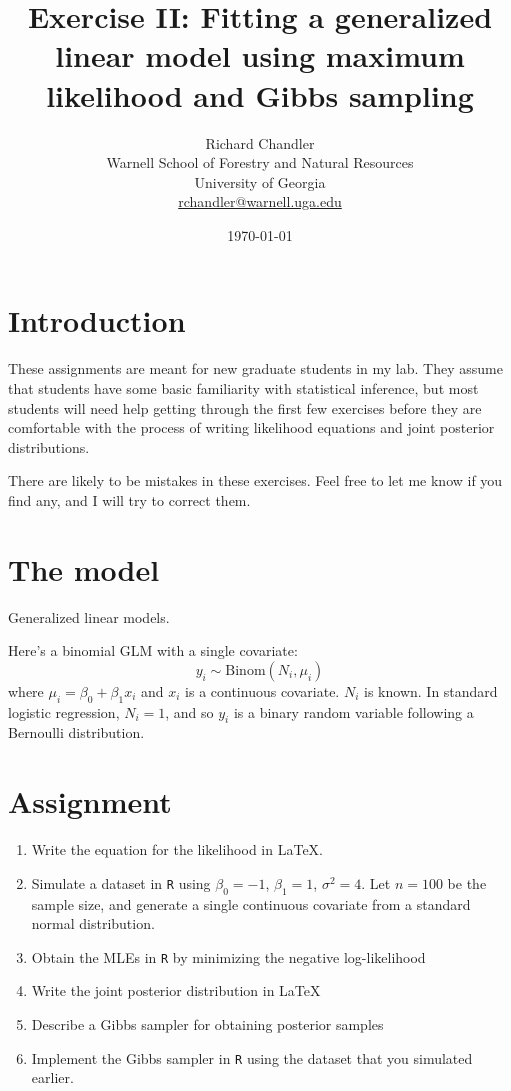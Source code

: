 \documentclass[11pt]{article}
\begin{document}
\title{Exercise II: Fitting a generalized linear model using maximum likelihood and
  Gibbs sampling} 
\author{Richard Chandler \\ Warnell School of Forestry and Natural
  Resources \\ University of Georgia \\ \href{mailto:rchandler@warnell.uga.edu}{rchandler@warnell.uga.edu}
}
\date{\today}

\maketitle


\section*{Introduction}

These assignments are meant for new graduate students in my lab. They
assume that students have some basic familiarity with statistical
inference, but most students will need help getting through the first
few exercises before they are comfortable with the process of writing
likelihood equations and joint posterior distributions. 

There are likely to be mistakes in these exercises. Feel free to let
me know if you find any, and I will try to correct them.


\section*{The model}

Generalized linear models.

Here's a binomial GLM with a single covariate:
\[
  y_i \sim \mathrm{Binom}(N_i, \mu_i)
\]
where $\mu_i = \beta_0 + \beta_1 x_i$ and $x_i$ is a continuous
covariate. $N_i$ is known. In standard logistic regression, $N_i=1$,
and so $y_i$ is a binary random variable following a Bernoulli distribution.

\section*{Assignment}


\begin{enumerate}
  \item Write the equation for the likelihood in \LaTeX.
  \item Simulate a dataset in {\tt R} using $\beta_0=-1$, $\beta_1=1$,
    $\sigma^2=4$. Let $n=100$ be the sample size, and generate a
    single continuous covariate from a standard normal distribution.
  \item Obtain the MLEs in {\tt R} by minimizing the negative log-likelihood
  \item Write the joint posterior distribution in \LaTeX
  \item Describe a Gibbs sampler for obtaining posterior samples
  \item Implement the Gibbs sampler in {\tt R} using the dataset that
    you simulated earlier.
\end{enumerate}
\end{document}
